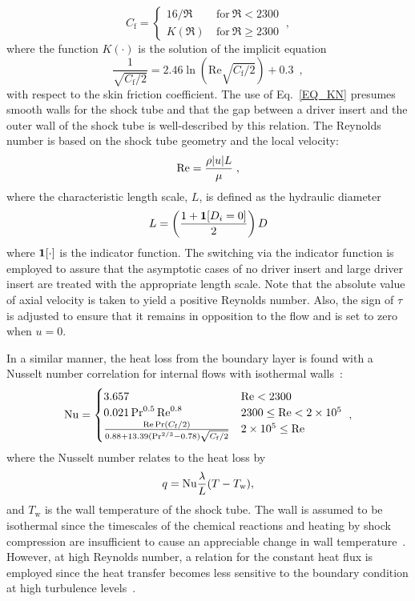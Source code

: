 \begin{equation}
\label{EQ_CF}
C_\mathrm{f}=
\begin{cases}
{16}/{\Re}\ &\text{for}\ \Re<2300 \\
K(\Re)\ &\text{for}\ \Re\ge 2300
\end{cases}\ ,
\end{equation}
where the function $K(\cdot)$ is the solution of the implicit equation
\begin{equation}\label{EQ_KN}
\frac{1}{\sqrt{C_{\mathrm{f}}/2}}=2.46\ln\left(\mathrm{Re}\sqrt{C_{\mathrm{f}}/2}\right)+0.3\;\ ,
\end{equation}	
with respect to the skin friction coefficient. The use of Eq.~\ref{EQ_KN} presumes smooth walls for the shock tube and that the gap between a driver insert and the outer wall of the shock tube is well-described by this relation. The Reynolds number is based on the shock tube geometry and the local velocity:
\begin{equation}
\label{EQ_RED}
{\rm{Re}}={\frac{\rho |u|L}{\mu}}\; ,
\end{equation}
where the characteristic length scale, $L$, is defined as the hydraulic diameter
\begin{equation}
	L=\left(\frac{1+{\mathbf{1}}[D_i=0]}{2}\right)D
\end{equation}
where ${\mathbf{1}}[\cdot]$ is the indicator function. The switching via the indicator function is employed to assure that the asymptotic cases of no driver insert and large driver insert are treated with the appropriate length scale. Note that the absolute value of axial velocity is taken to yield a positive Reynolds number. Also, the sign of $\tau$ is adjusted to ensure that it remains in opposition to the flow and is set to zero when $u=0$. 

In a similar manner, the heat loss from the boundary layer is found with a Nusselt number correlation for internal flows with isothermal walls~\cite{KAYS_BOOK2005}:
\begin{equation}
\label{EQ_NU}
{\rm{Nu}}=
\begin{cases}
3.657 & {\rm{Re}}<2300 \\
0.021\Pr^{0.5}{\rm{Re}}^{0.8} & 2300\le{\rm{Re}}< 2\times 10^5\\
\frac{{\rm{Re}}\Pr(C_{\mathrm{f}}/2)}{0.88+13.39(\mathrm{Pr}^{2/3}-0.78)\sqrt{C_{\mathrm{f}}/2}} & 2\times 10^5\le {\rm{Re}}
\end{cases}\ ,
\end{equation}
where the Nusselt number relates to the heat loss by
\begin{equation}
q={\rm{Nu}}\frac{\lambda}{L}(T-T_{\mathrm{w}}) ,
\end{equation}
and $T_{\mathrm{w}}$ is the wall temperature of the shock tube. The wall is assumed to be isothermal since the timescales of the chemical reactions and heating by shock compression are insufficient to cause an appreciable change in wall temperature~\cite{MARK_JAS1957}. However, at high Reynolds number, a relation for the constant heat flux is employed since the heat transfer becomes less sensitive to the boundary condition at high turbulence levels~\cite{KAYS_BOOK2005}.
